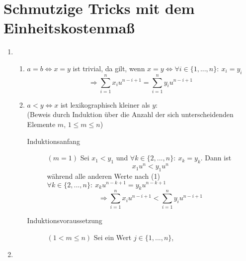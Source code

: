 \documentclass[a4paper,10pt]{scrartcl}
\renewcommand{\labelenumii}{(\theenumii)}
\renewcommand{\labelenumii}{(\theenumii)}
\renewcommand{\theenumii}{\roman{enumii}}
\begin{document}
\section{Schmutzige Tricks mit dem Einheitskostenmaß}
\begin{enumerate}
\item   \renewcommand{\labelenumii}{(\theenumii)}
        \renewcommand{\theenumii}{\arabic{enumii}}
        \begin{enumerate}
        \item   $a = b \Leftrightarrow x = y$ ist trivial, da gilt, wenn 
                $x = y \Leftrightarrow \forall i \in \{1, ..., n\}{:}\ x_i = y_i$\\
                \[\Rightarrow \sum\limits_{i=1}^{n} x_{i}u^{n-i+1} = \sum\limits_{i=1}^{n} y_{i}u^{n-i+1}\]
        \item   $a < y \Leftrightarrow x$ ist lexikographisch kleiner als $y$:\\
                (Beweis durch Induktion über die Anzahl der sich unterscheidenden Elemente $m$, $1 \leq m \leq n$)
                \begin{description}
                \item[Induktionsanfang] $(m=1)$ Sei $x_1 < y_1$ und $\forall k \in \{2, ..., n\}{:}\ x_k = y_k$. Dann ist
                    \[x_1 u^{n} < y_1 u^{n}\]
                    während alle anderen Werte nach (1) 
                    $\forall k \in \{2, ..., n\}{:}\ x_k u^{n-k+1} = y_k u^{n-k+1}$
                    \[\Rightarrow \sum\limits_{i=1}^{n} x_{i}u^{n-i+1} < \sum\limits_{i=1}^{n} y_{i}u^{n-i+1}\]
                \item[Induktionsvoraussetzung] $(1 < m \leq n)$ Sei ein Wert $j \in \{1, ..., n\}$, 
                \end{description}
        \end{enumerate}
\item   
\end{enumerate}
\end{document}

